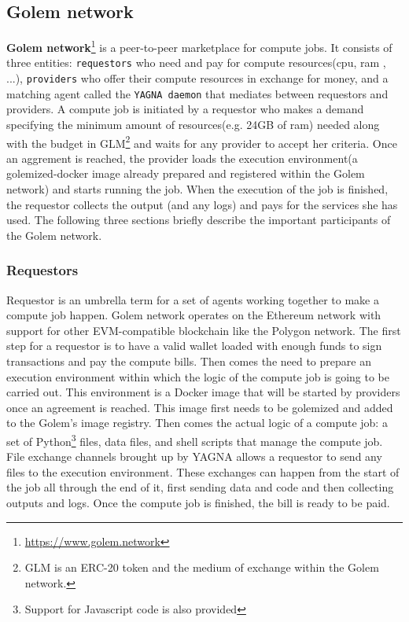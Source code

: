 \documentclass[a4paper, 10pt]{article}
\begin{document}
\subsection{Golem network}
\textbf{Golem network}\footnote{\url{https://www.golem.network}} is a peer-to-peer marketplace for compute jobs. It consists of three entities: \texttt{requestors} who need and pay for compute resources(cpu, ram , ...), \texttt{providers} who offer their compute resources in exchange for money, and a matching agent called the \texttt{YAGNA daemon} that mediates between requestors and providers. A compute job is initiated by a requestor who makes a demand specifying the minimum amount of resources(e.g. 24GB of ram) needed along with the budget in GLM\footnote{GLM is an ERC-20 token and the medium of exchange within the Golem network.} and waits for any provider to accept her criteria. Once an aggrement is reached, the provider loads the execution environment(a golemized-docker image already prepared and registered within the Golem network) and starts running the job. When the execution of the job is finished, the requestor collects the output (and any logs) and pays for the services she has used. The following three sections briefly describe the important participants of the Golem network.
\subsubsection*{Requestors}
Requestor is an umbrella term for a set of agents working together to make a compute job happen. Golem network operates on the Ethereum network with support for other EVM-compatible blockchain like the Polygon network. The first step for a requestor is to have a valid wallet loaded with enough funds to sign transactions and pay the compute bills. Then comes the need to prepare an execution environment within which the logic of the compute job is going to be carried out. This environment is a Docker image that will be started by providers once an agreement is reached. This image first needs to be golemized and added to the Golem's image registry. Then comes the actual logic of a compute job: a set of Python\footnote{Support for Javascript code is also provided} files, data files, and shell scripts that manage the compute job. File exchange channels brought up by YAGNA allows a requestor to send any files to the execution environment. These exchanges can happen from the start of the job all through the end of it, first sending data and code and then collecting outputs and logs. Once the compute job is finished, the bill is ready to be paid.
\end{document}
